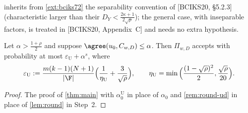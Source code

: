 \begin{remark}[Characteristic]\label{rem:char}
 inherits from \cref{ext:bciks72} the separability convention of
[BCIKS20, \S5.2.3] (characteristic larger than their $D_Y<\frac{2\kappa+1}{2\sqrt\rho}$); the
general case, with inseparable factors, is treated in [BCIKS20, Appendix~C] and needs no
extra hypothesis.
\end{remark}

{\renewcommand{\thecorollary}{1.1}\begin{corollary}\label{cor:ud}
Let $\alpha>\frac{1+\rho}2$ and suppose $\agree(u_0,C_{w,D})\le\alpha$. Then $\Pi_{w,D}$
accepts with probability at most $\varepsilon_{\mathrm U}+\alpha^s$, where
\[
\varepsilon_{\mathrm U}:=\frac{m(k-1)(N+1)}{|\F|}\Big(\frac1{\eta_{\mathrm U}}+\frac3{\sqrt\rho}\Big),
\qquad \eta_{\mathrm U}=\min\Big(\frac{(1-\sqrt\rho)^2}2,\frac{\sqrt\rho}{20}\Big).
\]
\end{corollary}

\begin{proof}
The proof of \cref{thm:main} with $\alpha^{\mathrm U}_0$ in place of $\alpha_0$ and
\cref{rem:round-ud} in place of \cref{lem:round} in Step~2.
\end{proof}}
